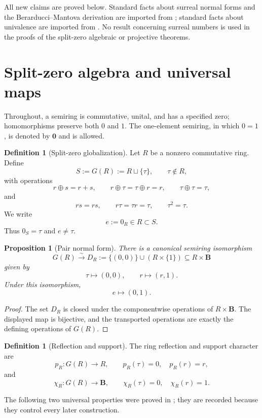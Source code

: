 \documentclass[11pt]{amsart}
\numberwithin{equation}{section}
\newtheorem{proposition}[theorem]{Proposition}
\theoremstyle{definition}
\newtheorem{definition}[theorem]{Definition}
\newcommand{\B}{\mathbf B}
\newcommand{\zero}{\mathbf 0}
\begin{document}
All new claims are proved below.  Standard facts about surreal normal forms and the Berarducci--Mantova derivation are imported from \cite{Conway,BerarducciMantova}; standard facts about univalence are imported from \cite{HoTT}.  No result concerning surreal numbers is used in the proofs of the split-zero algebraic or projective theorems.

\section{Split-zero algebra and universal maps}

Throughout, a semiring is commutative, unital, and has a specified zero; homomorphisms preserve both $0$ and $1$.  The one-element semiring, in which $0=1$, is denoted by $\zero$ and is allowed.

\begin{definition}[Split-zero globalization]
Let $R$ be a nonzero commutative ring.  Define
\[
S:=G(R):=R\sqcup\{\tau\},
\qquad \tau\notin R,
\]
with operations
\[
r\oplus s=r+s,
\qquad
r\oplus\tau=\tau\oplus r=r,
\qquad
\tau\oplus\tau=\tau,
\]
and
\[
rs=rs,
\qquad
r\tau=\tau r=\tau,
\qquad
\tau^2=\tau.
\]
We write
\[
e:=0_R\in R\subset S.
\]
Thus $0_S=\tau$ and $e\neq\tau$.
\end{definition}

\begin{proposition}[Pair normal form]\label{prop:pair-normal-form}
There is a canonical semiring isomorphism
\[
G(R)\xrightarrow{\sim}
D_R:=\{(0,0)\}\cup(R\times\{1\})
\subseteq R\times\B
\]
given by
\[
\tau\longmapsto(0,0),
\qquad
r\longmapsto(r,1).
\]
Under this isomorphism,
\[
e\longmapsto(0,1).
\]
\end{proposition}

\begin{proof}
The set $D_R$ is closed under the componentwise operations of $R\times\B$.  The displayed map is bijective, and the transported operations are exactly the defining operations of $G(R)$.
\end{proof}

\begin{definition}[Reflection and support]
The ring reflection and support character are
\[
p_R:G(R)\longrightarrow R,
\qquad
p_R(\tau)=0,
\quad
p_R(r)=r,
\]
and
\[
\chi_R:G(R)\longrightarrow\B,
\qquad
\chi_R(\tau)=0,
\quad
\chi_R(r)=1.
\]
\end{definition}

The following two universal properties were proved in \cite{Secondary}; they are recorded because they control every later construction.
\end{document}
